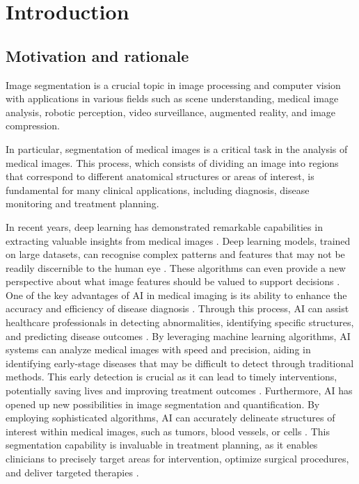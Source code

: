 \newpage
\section{Introduction}
\subsection{Motivation and rationale}
Image segmentation is a crucial topic in image processing and computer vision with applications in various fields such as scene understanding, medical image analysis, robotic perception, video surveillance, augmented reality, and image compression.

In particular, segmentation of medical images is a critical task in the analysis of medical images. This process, which consists of dividing an image into regions that correspond to different anatomical structures or areas of interest, is fundamental for many clinical applications, including diagnosis, disease monitoring and treatment planning.

In recent years, deep learning has demonstrated remarkable capabilities in extracting valuable insights from medical images \cite{GhaffarNia2023EvaluationOA}.
Deep learning models, trained on large datasets, can recognise complex patterns and features that may not be readily discernible to the human eye \cite{hosny_artificial_2018, kumar_artificial_2023}.
These algorithms can even provide a new perspective about what image features should be valued to support decisions \cite{waldstein2020unbiased}. One of the key advantages of AI in medical imaging is its ability to enhance the accuracy and efficiency of disease diagnosis \cite{GhaffarNia2023EvaluationOA, plested2022deep}. Through this process, AI can assist healthcare professionals in detecting abnormalities, identifying specific structures, and predicting disease outcomes \cite{plested2022deep, alowais_revolutionizing_2023}. By leveraging machine learning algorithms, AI systems can analyze medical images with speed and precision, aiding in identifying early-stage diseases that may be difficult to detect through traditional methods. This early detection is crucial as it can lead to timely interventions, potentially saving lives and improving treatment outcomes \cite{GhaffarNia2023EvaluationOA, hosny_artificial_2018, kumar_artificial_2023}. Furthermore, AI has opened up new possibilities in image segmentation and quantification. By employing sophisticated algorithms, AI can accurately delineate structures of interest within medical images, such as tumors, blood vessels, or cells \cite{bioengineering9090467, bioengineering9090475, 9066969}. This segmentation capability is invaluable in treatment planning, as it enables clinicians to precisely target areas for intervention, optimize surgical procedures, and deliver targeted therapies \cite{VANDESANDE2021111}.\\

